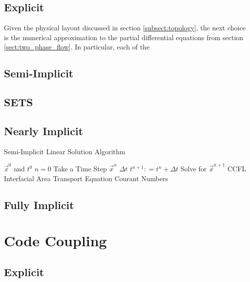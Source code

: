 \subsection{Explicit}
\label{subsect:numerics_explicit}
Given the physical layout discussed in section \ref{subsect:topology}, the next choice is the numerical approximation to the partial differential equations from section \ref{sect:two_phase_flow}.
In particular, each of the 

\subsection{Semi-Implicit}
\label{subsect:numerics_semi_implicit}


\subsection{SETS}
\label{subsect:numerics_sets}

\subsection{Nearly Implicit}
\label{subsect:numerics_nearly_implicit}

\begin{algo}[H]
\caption{Semi-Implicit Linear Solution Algorithm}
\label{algo:semi_implicit}
\setlength{\baselineskip}{0.625\baselineskip}
\begin{algorithmic}[1]
\Require $\Vec{x}^{0}$ and $t^{0}$
\Set $n = 0$
\Loop \; Take a Time Step
    \Set $\vec{x}^{n}$        
    \Calculate $\Delta t$ 
    \State $t^{n+1} : = t^{n} + \Delta t$
    \BlackBox Solve for $\vec{x}^{n+1}$ 
    \Test CCFL 
    \BlackBox Interfacial Area Transport Equation
    \Calculate Courant Numbers 
\end{algorithmic}
\end{algo}

\subsection{Fully Implicit}
\label{subsect:numerics_fully_implicit}

\section{Code Coupling}
\label{sect:code_coupling}

\subsection{Explicit}
\label{subsect:coupling_explicit}

